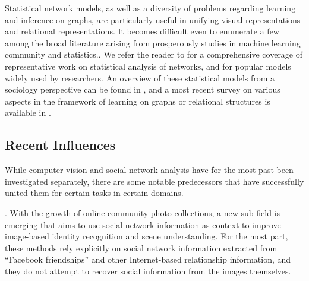 Statistical network models, as well as a diversity of problems regarding learning and inference on graphs, are particularly useful in unifying visual representations and relational representations. It becomes difficult even to enumerate a few among the broad literature arising from prosperously studies in machine learning community and statistics..  We refer the reader to \cite{Kolacyzk} for a comprehensive coverage of representative work on statistical analysis of networks, and \cite{Goldenberg} for popular models widely used by researchers. An overview of these statistical models from a sociology perspective can be found in \cite{Snijders}, and a most recent survey on various aspects in the framework of learning on graphs or relational structures is available in \cite{Rossi}.

\subsection{Recent Influences}

While computer vision and social network analysis have for the most past been investigated separately, there are some notable predecessors that have successfully united them for certain tasks in certain domains.

. With the growth of online community photo collections, a new sub-field is emerging that aims to use social network information as context to improve image-based identity recognition and scene understanding. For the most part, these methods rely explicitly on social network information extracted from ``Facebook friendships'' and other Internet-based relationship information, and they do not attempt to recover social information from the images themselves. 

